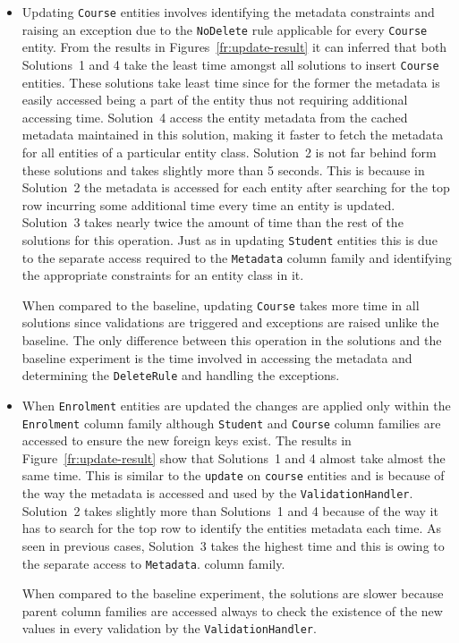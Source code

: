\begin{itemize}
	  \item Updating \texttt{Course} entities involves identifying the metadata
	constraints and raising an exception due to the \texttt{NoDelete} rule applicable for every
	\texttt{Course} entity. From the
	results in Figures~\ref{fr:update-result} it can inferred that both Solutions~1 and 4 take
	the least time amongst all solutions to insert \texttt{Course} entities. These
	solutions take least time since for the former the metadata is easily accessed
	being a part of the entity thus not requiring additional accessing time.
	Solution~4 access the entity metadata from the cached metadata maintained in
	this solution, making it faster to fetch the metadata for all entities of a
	particular entity class. 
	Solution~2 is not far behind form these solutions and
	takes slightly more than 5 seconds. This is because in Solution~2 the metadata
	is accessed for each entity after searching for the top row incurring some
	additional time every time an entity is updated. Solution~3 takes nearly twice
	the amount of time than the rest of the solutions for this operation. Just as
	in updating \texttt{Student} entities this is due to the separate access
	required to the \texttt{Metadata} column family and identifying the appropriate constraints for an entity class in it. 
	
	When compared to the baseline, updating \texttt{Course} takes more time in all
	solutions since  validations are triggered and  exceptions are raised unlike
	the baseline. The only difference between this operation in the solutions and the
	baseline experiment is the time involved in accessing the metadata and
	determining the \texttt{DeleteRule} and handling the exceptions.
	
	\item When \texttt{Enrolment} entities are  updated the changes are applied
	only within the
	\texttt{Enrolment} column family although \texttt{Student} and
	\texttt{Course} column families are accessed to ensure the new
	foreign keys exist. The results in Figure~\ref{fr:update-result} show that
	Solutions~1 and 4 almost take almost the same time. This is similar to the
	\texttt{update} on \texttt{course} entities and is because of the way the
	metadata is accessed and used by the \texttt{ValidationHandler}. 
	Solution~2 takes slightly more than Solutions~1 and 4 because of the way it
	has to search for the top row to identify the entities metadata each time.
	As seen in previous cases, Solution~3 takes the highest time and this is owing
	to the separate access to \texttt{Metadata}. column family.
	
	When compared to the baseline experiment, the solutions are slower because
	parent column families are accessed always  to check the existence of the new
	values in every validation by the \texttt{ValidationHandler}. 
	\end{itemize}
	
